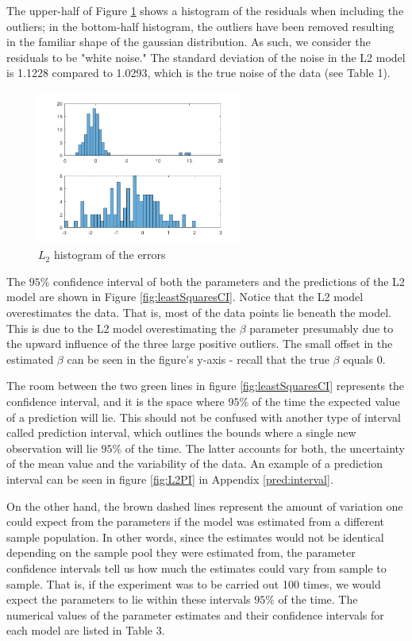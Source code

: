 The upper-half of Figure \ref{fig:leastSquaresHist} shows a histogram of the residuals when including the outliers; in the bottom-half histogram, the outliers have been removed resulting in the familiar shape of the gaussian distribution. As such, we consider the residuals to be "white noise." The standard deviation of the noise in the L2 model is 1.1228 compared to 1.0293, which is the true noise of the data (see Table 1).    

\begin{figure}[htb]
\centering
\includegraphics[width=0.6\textwidth]{../img/L2_hist}
\caption{$L_2$ histogram of the errors}
\label{fig:leastSquaresHist}
\end{figure}


The $95\%$ confidence interval of both the parameters and the predictions of the L2 model are shown in Figure \ref{fig:leastSquaresCI}. Notice that the L2 model overestimates the data. That is, most of the data points lie beneath the model. This is due to the L2 model overestimating the $\beta$ parameter presumably due to the upward influence of the three large positive outliers. The small offset in the estimated $\beta$ can be seen in the figure's y-axis - recall that the true $\beta$ equals 0. 
 
The room between the two green lines in figure \ref{fig:leastSquaresCI} represents the confidence interval, and it is the space where $95 \%$ of the time the expected value of a prediction will lie. This should not be confused with another type of interval called prediction interval, which outlines the bounds where a single new observation will lie $95\%$ of the time. The latter accounts for both, the uncertainty of the mean value and the variability of the data. An example of a prediction interval can be seen in figure \ref{fig:L2PI} in Appendix \ref{pred:interval}. 

On the other hand, the brown dashed lines represent the amount of variation one could expect from the parameters if the model was estimated from a different sample population. In other words, since the estimates would not be identical depending on the sample pool they were estimated from, the parameter confidence intervals tell us how much the estimates could vary from sample to sample.  That is, if the experiment was to be carried out 100 times, we would expect the parameters to lie within these intervals $95 \%$ of the time. The numerical values of the parameter estimates and their confidence intervals for each model are listed in Table 3. 

